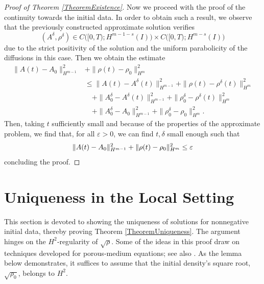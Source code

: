 \documentclass[12pt]{amsart}
\begin{document}
\begin{proof}[Proof of Theorem \ref{TheoremExistence}]
Now we proceed with the proof of the  continuity towards the initial data. In order to obtain such a result, we observe that the previously constructed approximate solution verifies
\[
(A^{\delta},\rho^\delta)\in C\bigl([0,T);H^{m-1-s}(I)\bigr)\times C\bigl([0,T);H^{m-s}(I)\bigr)
\]
due to the strict positivity of the solution and the uniform parabolicity of the diffusions in this case.  Then we obtain the estimate
\[
\begin{split}
\|A(t)-A_0\|_{H^{m-1}}^2&+\|\rho(t)-\rho_0\|_{H^{m}}^2\\
&\leq \|A(t)-A^\delta(t)\|_{H^{m-1}}^2+\|\rho(t)-\rho^\delta(t)\|_{H^{m}}^2\\& \quad +\|A^\delta_0-A^\delta(t)\|_{H^{m-1}}^2+\|\rho^\delta_0-\rho^\delta(t)\|_{H^{m}}^2\\& \quad+\|A^\delta_0-A_0\|_{H^{m-1}}^2+\|\rho^\delta_0-\rho_0\|_{H^{m}}^2.
\end{split}
\]
Then, taking $t$ sufficiently small and because of the properties of the approximate problem, we find that, for all $\varepsilon>0$, we can find $t,\delta$ small enough such that
\[
\|A(t)-A_0\|_{H^{m-1}}^2+\|\rho(t)-\rho_0\|_{H^{m}}^2\leq \varepsilon\\
\]
concluding the proof.
\end{proof}
\section{Uniqueness in the Local Setting}
	\label{sec:3}
	
    This section is devoted to showing the uniqueness of solutions for nonnegative initial data, thereby proving Theorem \ref{TheoremUniqueness}. The argument hinges on the $H^2$‐regularity of $\sqrt{\rho}$. Some of the ideas in this proof draw on techniques developed for porous‐medium equations; see also \cite{Fanelli2023}. As the lemma below demonstrates, it suffices to assume that the initial density’s square root, $\sqrt{\rho_0}$, belongs to $H^2$.
\end{document}
